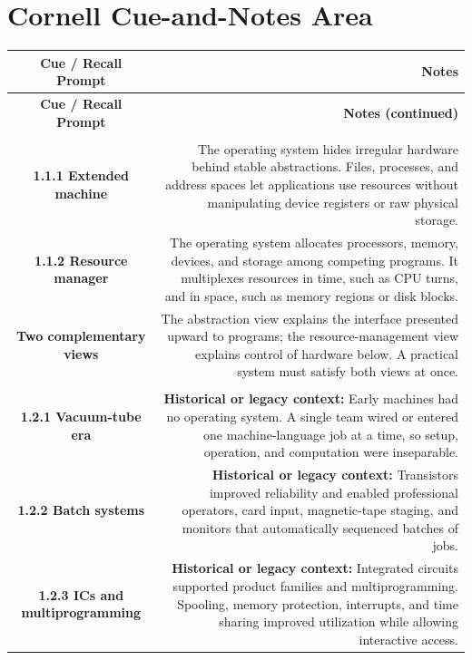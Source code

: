 \documentclass[10pt,letterpaper]{article}
\begin{document}
\section*{Cornell Cue-and-Notes Area}
\small
\begin{longtable}{C N}
\color{white}\textbf{Cue / Recall Prompt} &
\color{white}\textbf{Notes}\\
\endfirsthead
{}
\color{white}\textbf{Cue / Recall Prompt} &
\color{white}\textbf{Notes (continued)}\\
\endhead
{}\\*\hline
\textbf{1.1.1 Extended machine} & The operating system hides irregular hardware behind stable abstractions. Files, processes, and address spaces let applications use resources without manipulating device registers or raw physical storage.\\\hline
\textbf{1.1.2 Resource manager} & The operating system allocates processors, memory, devices, and storage among competing programs. It multiplexes resources in time, such as CPU turns, and in space, such as memory regions or disk blocks.\\\hline
\textbf{Two complementary views} & The abstraction view explains the interface presented upward to programs; the resource-management view explains control of hardware below. A practical system must satisfy both views at once.\\\hline
{}\\*\hline
\textbf{1.2.1 Vacuum-tube era} & \textcolor{legacy}{\textbf{Historical or legacy context:}} Early machines had no operating system. A single team wired or entered one machine-language job at a time, so setup, operation, and computation were inseparable.\\\hline
\textbf{1.2.2 Batch systems} & \textcolor{legacy}{\textbf{Historical or legacy context:}} Transistors improved reliability and enabled professional operators, card input, magnetic-tape staging, and monitors that automatically sequenced batches of jobs.\\\hline
\textbf{1.2.3 ICs and multiprogramming} & \textcolor{legacy}{\textbf{Historical or legacy context:}} Integrated circuits supported product families and multiprogramming. Spooling, memory protection, interrupts, and time sharing improved utilization while allowing interactive access.\\\hline

\end{longtable}
\end{document}
